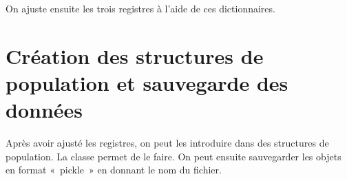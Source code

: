 \documentclass[letterpaper,10pt,french]{sphinxmanual}
\begin{document}
On ajuste ensuite les trois registres à l’aide de ces dictionnaires.

\begin{sphinxVerbatim}[commandchars=\\\{\}]
  
  
  
\end{sphinxVerbatim}

\begin{sphinxVerbatim}[commandchars=\\\{\}]
\end{sphinxVerbatim}



\begin{sphinxVerbatim}[commandchars=\\\{\}]
  
  
  
\end{sphinxVerbatim}


\section{Création des structures de population et sauvegarde des données}
\label{\detokenize{import:creation-des-structures-de-population-et-sauvegarde-des-donnees}}
Après avoir ajusté les registres, on peut les introduire dans des structures de population. La classe  permet de le faire. On peut ensuite sauvegarder les objets en format « pickle » en donnant le nom du fichier.

\begin{sphinxVerbatim}[commandchars=\\\{\}]
  
\end{sphinxVerbatim}
\end{document}
